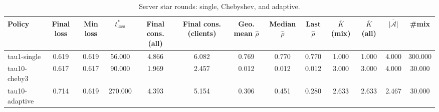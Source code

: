 \begin{table}[t]
\centering
\begin{tabular}{lcccccccccccc}
\toprule
Policy & Final loss & Min loss & $t^*_{\text{loss}}$ & Final cons. (all) & Final cons. (clients) & Geo. mean $\widehat{\rho}$ & Median $\widehat{\rho}$ & Last $\widehat{\rho}$ & $\overline{K}$ (mix) & $\overline{K}$ (all) & $\overline{|\mathcal A|}$ & #mix \\
\midrule
tau1-single & 0.619 & 0.619 & 56.000 & 4.866 & 6.082 & 0.769 & 0.770 & 0.770 & 1.000 & 1.000 & 4.000 & 300.000 \\
tau10-cheby3 & 0.617 & 0.617 & 90.000 & 1.969 & 2.457 & 0.012 & 0.012 & 0.012 & 3.000 & 3.000 & 4.000 & 30.000 \\
tau10-adaptive & 0.714 & 0.619 & 270.000 & 4.393 & 5.154 & 0.306 & 0.451 & 0.280 & 2.633 & 2.633 & 2.467 & 30.000 \\
\bottomrule
\end{tabular}
\caption{Server star rounds: single, Chebyshev, and adaptive.}
\label{tab:server}
\end{table}